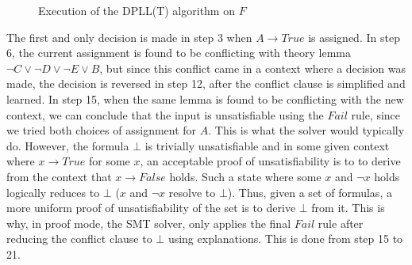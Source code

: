 \documentclass{article}
\begin{document}
\begin{figure}[t]
\begin{center}
	\end{center}
	\caption{Execution of the DPLL(T) algorithm on $F$}
	\label{fig:dplltex}
	\end{figure}
	The first and only decision is made in 
	step 3 when $A \to True$ is assigned.
	In step 6, the current assignment is 
	found to be conflicting with theory
	lemma $\neg C \lor \neg D \lor \neg E
	\lor B$, but since this conflict 
	came in a context where a decision
	was made, the decision is reversed
	in step 12, after the conflict clause 
	is simplified and learned. In step 15, 
	when the same lemma is found to be 
	conflicting with the new context, we 
	can conclude that the input is 
	unsatisfiable using the $Fail$ rule, 
	since we tried both choices of 
	assignment for $A$. This is what 
	the solver would typically do. However, 
	the formula $\bot$ 
	is trivially unsatisfiable and in 
	some given context where 
	$x \to True$ for some $x$, an 
	acceptable proof of unsatisfiability 
	is to to derive from the context that 
	$x \to False$ holds. Such a state 
	where some $x$ and $\neg x$ holds
	logically reduces to $\bot$ 
	($x$ and $\neg x$ resolve to $\bot$).
	Thus, given a set of formulas,
	a more uniform proof of 
	unsatisfiability of the set is 
	to derive $\bot$ from it. This is why, 
	in proof mode, the SMT solver, only 
	applies the final $Fail$ rule after 
	reducing the conflict clause to $\bot$
	using explanations. This is done 
	from step 15 to 21.
	
\end{document}
